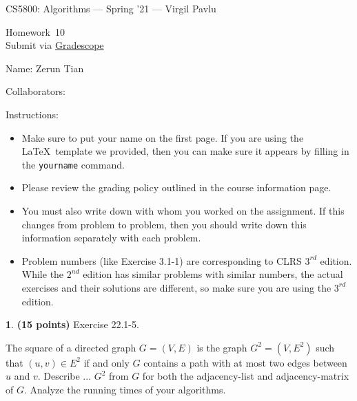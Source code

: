\documentclass[11pt]{article}
\newcommand{\yourname}{Zerun Tian}
\newcommand{\yourcollaborators}{}
\theoremstyle{definition}
\newcommand{\instructor}{Virgil Pavlu}
\newcommand{\hwnum}{10}
\theoremstyle{theorem}
\newtheorem{prob}{}
\newcommand{\solution}{\medskip\noindent{\color{DarkBlue}\textbf{Solution:}}}
\begin{document}
{\Large 
\begin{center}{CS5800: Algorithms} --- Spring '21 --- \instructor \end{center}}
{\large
\vspace{10pt}
\noindent Homework~\hwnum \vspace{2pt}\\
Submit via \href{https://www.gradescope.com/courses/232127}{Gradescope}}

\bigskip
{\large \noindent Name: \yourname }

{\large \noindent Collaborators: \yourcollaborators}

\vspace{15pt}

{\large \noindent Instructions:}

\begin{itemize}

\item Make sure to put your name on the first page.  If you are using the \LaTeX~template we provided, then you can make sure it appears by filling in the \texttt{yourname} command.

\item Please review the grading policy outlined in the course information page.

\item You must also write down with whom you worked on the assignment.  If this changes from problem to problem, then you should write down this information separately with each problem.

\item Problem numbers (like Exercise 3.1-1) are corresponding to CLRS $3^{rd}$ edition.  While the  $2^{nd}$ edition  has  similar  problems  with  similar  numbers,  the  actual  exercises  and their solutions are different, so make sure you are using the $3^{rd}$ edition.

\end{itemize}

\newpage
\begin{prob} \textbf{(15 points)} Exercise 22.1-5.
\end{prob}
The square of a directed graph $G = (V, E)$ is the graph $G^2 = (V, E^2)$ such that $(u, v) \in E^2$ if and only $G$ contains a path with at most two edges between $u$ and $v$. Describe ... $G^2$ from $G$ for both the adjacency-list and adjacency-matrix of $G$. Analyze the running times of your algorithms.

\solution
\end{document}
